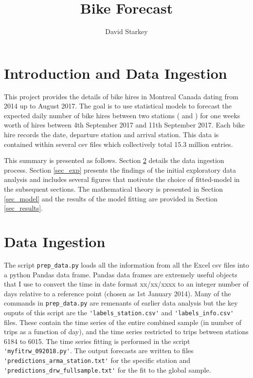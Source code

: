 \documentclass[10pt]{article}
\begin{document}
\title{Bike Forecast}

\author{David Starkey}

\maketitle





\section{Introduction and Data Ingestion}
This project provides the details of bike hires in Montreal Canada dating from 2014 up to August 2017. The goal is to use statistical models to forecast the expected daily number of bike hires between two stations ( and ) for one weeks worth of hires between 4th September 2017 and 11th September 2017. Each bike hire records the date, departure station and arrival station. This data is contained within several csv files which collectively total 15.3 million entries.

This summary is presented as follows. Section \ref{sec_ingest} details the data ingestion process. Section \ref{sec_exp} presents the findings of the initial exploratory data analysis and includes several figures that motivate the choice of fitted-model in the subsequent sections. The mathematical theory is presented in Section \ref{sec_model} and the results of the model fitting are provided in Section \ref{sec_results}.


\section{Data Ingestion}
\label{sec_ingest}
The script \verb|prep_data.py| loads all the information from all the Excel csv files into a python Pandas data frame. Pandas data frames are extremely useful objects that I use to convert the time in date format xx/xx/xxxx to an integer number of days relative to a reference point (chosen as 1st January 2014). Many of the commands in \verb|prep_data.py| are remenants of earlier data analysis but the key ouputs of this script are the \verb|'labels_station.csv'| and \verb|'labels_info.csv'| files. These contain the time series of the entire combined sample (in number of trips as a function of day), and the time series restricted to trips between stations 6184 to 6015. The time series fitting is performed in the script \verb|'myfitrw_092018.py'|. The output forecasts are written to files \verb|'predictions_arma_station.txt'| for the specific station and \verb|'predictions_drw_fullsample.txt'| for the fit to the global sample.
\end{document}
